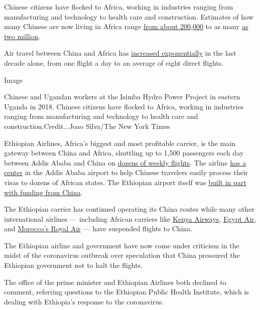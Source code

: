 Chinese citizens have flocked to Africa, working in industries ranging
from manufacturing and technology to health care and construction.
Estimates of how many Chinese are now living in Africa range
\href{http://www.sais-cari.org/data-chinese-workers-in-africa}{from
about 200,000} to as many
\href{https://www.migrationpolicy.org/article/african-countries-relax-short-term-visa-policies-chinese}{as
two million}.

Air travel between China and Africa has
\href{https://qz.com/africa/1675287/china-to-africa-flights-jumped-630-in-the-past-nine-years/}{increased
exponentially} in the last decade alone, from one flight a day to an
average of eight direct flights.

Image

Chinese and Ugandan workers at the Isimba Hydro Power Project in eastern
Uganda in 2018. Chinese citizens have flocked to Africa, working in
industries ranging from manufacturing and technology to health care and
construction.Credit...Joao Silva/The New York Times

Ethiopian Airlines, Africa's biggest and most profitable carrier, is the
main gateway between China and Africa, shuttling up to 1,500 passengers
each day between Addis Ababa and China on
\href{https://twitter.com/flyethiopian/status/1068381553192050691}{dozens
of weekly flights}. The airline
\href{http://www.xinhuanet.com/english/2018-11/28/c_137637633.htm}{has a
center} in the Addis Ababa airport to help Chinese travelers easily
process their visas to dozens of African states. The Ethiopian airport
itself was
\href{https://qz.com/africa/1535255/ethiopias-addis-ababa-bole-expanded-airport-triples-size/}{built
in part with funding from China}.

The Ethiopian carrier has continued operating its China routes while
many other international airlines --- including African carriers like
\href{https://twitter.com/KenyaAirways/status/1223119066937692162}{Kenya
Airways},
\href{https://twitter.com/EGYPTAIR/status/1222876029875838977}{Egypt
Air}, and
\href{https://twitter.com/RAM_Maroc/status/1222991000605536270}{Morocco's
Royal Air} --- have suspended flights to China.

The Ethiopian airline and government have now come under criticism in
the midst of the coronavirus outbreak over speculation that China
pressured the Ethiopian government not to halt the flights.

The office of the prime minister and Ethiopian Airlines both declined to
comment, referring questions to the Ethiopian Public Health Institute,
which is dealing with Ethiopia's response to the coronavirus.

